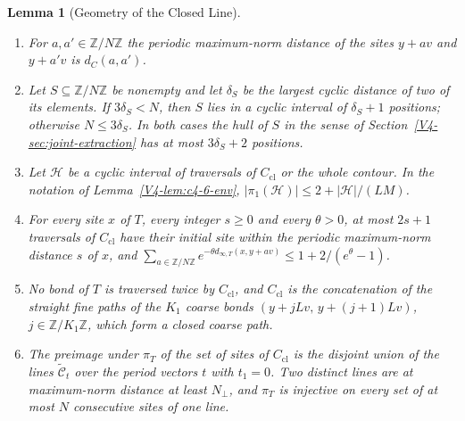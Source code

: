 \documentclass[11pt]{article}
\numberwithin{equation}{section}
\newtheorem{lemma}[theorem]{Lemma}
\theoremstyle{remark}
\theoremstyle{plain}
\begin{document}
\begin{lemma}[Geometry of the Closed Line]\label{lem:closed-line-geometry}
\begin{enumerate}[label=(\alph*)]
    \item For $a,a'\in\mathbb Z/N\mathbb Z$ the periodic maximum-norm distance of the sites $y+av$ and $y+a'v$ is $d_C(a,a')$.
    \item Let $S\subseteq\mathbb Z/N\mathbb Z$ be nonempty and let $\delta_S$ be the largest cyclic distance of two of its elements. If $3\delta_S< N$, then $S$ lies in a cyclic interval of $\delta_S+1$ positions; otherwise $N\leqslant 3\delta_S$. In both cases the hull of $S$ in the sense of Section~\ref{V4-sec:joint-extraction} has at most $3\delta_S+2$ positions.
    \item Let $\mathcal H$ be a cyclic interval of traversals of $C_{\mathrm{cl}}$ or the whole contour. In the notation of Lemma~\ref{V4-lem:c4-6-env}, $|\pi_1(\mathcal H)|\leqslant 2+|\mathcal H|/(LM)$.
    \item For every site $x$ of $T$, every integer $s\geqslant 0$ and every $\theta>0$, at most $2s+1$ traversals of $C_{\mathrm{cl}}$ have their initial site within the periodic maximum-norm distance $s$ of $x$, and $\sum_{a\in\mathbb Z/N\mathbb Z}e^{-\theta d_{\infty,T}(x,y+av)}\leqslant 1+2/(e^{\theta}-1)$.
    \item No bond of $T$ is traversed twice by $C_{\mathrm{cl}}$, and $C_{\mathrm{cl}}$ is the concatenation of the straight fine paths of the $K_1$ coarse bonds $(y+jLv,\,y+(j+1)Lv)$, $j\in\mathbb Z/K_1\mathbb Z$, which form a closed coarse path.
    \item The preimage under $\pi_T$ of the set of sites of $C_{\mathrm{cl}}$ is the disjoint union of the lines $\widetilde{\mathcal C}_t$ over the period vectors $t$ with $t_1=0$. Two distinct lines are at maximum-norm distance at least $N_{\perp}$, and $\pi_T$ is injective on every set of at most $N$ consecutive sites of one line.
\end{enumerate}
\end{lemma}
\end{document}
